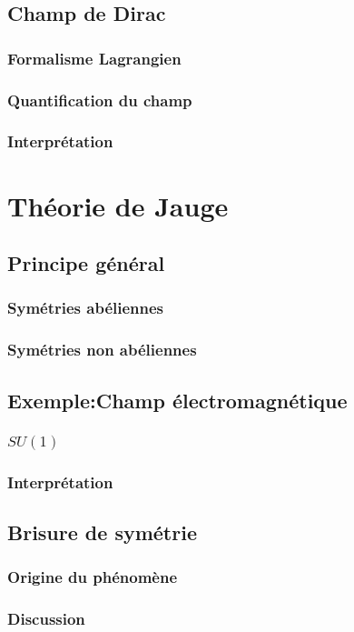 \documentclass{article}
\begin{document}
		\subsection{Champ de Dirac}
			\subsubsection{Formalisme Lagrangien}
			\subsubsection{Quantification du champ}
			\subsubsection{Interprétation}
		
	\section{Théorie de Jauge}
		\subsection{Principe général}
			\subsubsection{Symétries abéliennes}
			\subsubsection{Symétries non abéliennes}
		\subsection{Exemple:Champ électromagnétique}
			\subsubsection{$SU(1)$}
			\subsubsection{Interprétation}
		\subsection{Brisure de symétrie}
			\subsubsection{Origine du phénomène}
			\subsubsection{Discussion}
\end{document}
